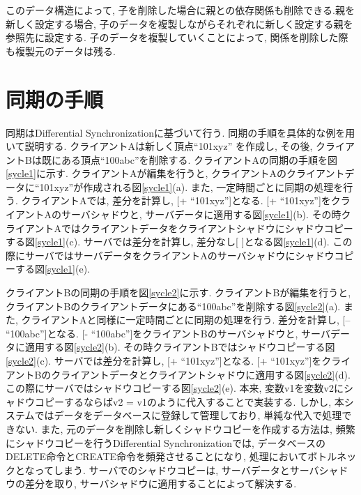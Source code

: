 このデータ構造によって, 子を削除した場合に親との依存関係も削除できる.親を新しく設定する場合, 子のデータを複製しながらそれぞれに新しく設定する親を参照先に設定する.
子のデータを複製していくことによって, 関係を削除した際も複製元のデータは残る.

\section{同期の手順}
同期はDifferential Synchronizationに基づいて行う.
同期の手順を具体的な例を用いて説明する. クライアントAは新しく頂点``101xyz''
を作成し, その後, クライアントBは既にある頂点``100abc''を削除する.
クライアントAの同期の手順を図\ref{sycle1}に示す.
クライアントAが編集を行うと, クライアントAのクライアントデータに``101xyz''が作成される図\ref{sycle1}(a).
また, 一定時間ごとに同期の処理を行う. クライアントAでは, 差分を計算し, [+ ``101xyz'']となる. [+ ``101xyz'']をクライアントAのサーバシャドウと, サーバデータに適用する図\ref{sycle1}(b). その時クライアントAではクライアントデータをクライアントシャドウにシャドウコピーする図\ref{sycle1}(c). サーバでは差分を計算し, 差分なし[ ]となる図\ref{sycle1}(d). この際にサーバではサーバデータをクライアントAのサーバシャドウにシャドウコピーする図\ref{sycle1}(e).
\par
クライアントBの同期の手順を図\ref{sycle2}に示す.
クライアントBが編集を行うと, クライアントBのクライアントデータにある``100abc''を削除する図\ref{sycle2}(a).
また, クライアントAと同様に一定時間ごとに同期の処理を行う. 差分を計算し, [-- ``100abc'']となる. [- ``100abc'']をクライアントBのサーバシャドウと, サーバデータに適用する図\ref{sycle2}(b). その時クライアントBではシャドウコピーする図\ref{sycle2}(c). サーバでは差分を計算し, [+ ``101xyz'']となる. [+ ``101xyz'']をクライアントBのクライアントデータとクライアントシャドウに適用する図\ref{sycle2}(d). この際にサーバではシャドウコピーする図\ref{sycle2}(e).
本来, 変数v1を変数v2にシャドウコピーするならばv2 = v1のように代入することで実装する. しかし, 本システムではデータをデータベースに登録して管理しており, 単純な代入で処理できない.
また, 元のデータを削除し新しくシャドウコピーを作成する方法は, 頻繁にシャドウコピーを行うDifferential Synchronizationでは,
データベースのDELETE命令とCREATE命令を頻発させることになり, 処理においてボトルネックとなってしまう. サーバでのシャドウコピーは, サーバデータとサーバシャドウの差分を取り, サーバシャドウに適用することによって解決する.
